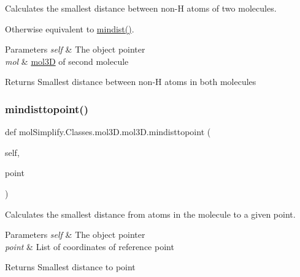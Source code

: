Calculates the smallest distance between non-\/H atoms of two molecules. 

Otherwise equivalent to \hyperlink{classmolSimplify_1_1Classes_1_1mol3D_1_1mol3D_ab051fea5908eab8ddcd39d4ea4688657}{mindist()}. 
\begin{DoxyParams}{Parameters}
{\em self} & The object pointer \\
\hline
{\em mol} & \hyperlink{classmolSimplify_1_1Classes_1_1mol3D_1_1mol3D}{mol3D} of second molecule \\
\hline
\end{DoxyParams}
\begin{DoxyReturn}{Returns}
Smallest distance between non-\/H atoms in both molecules 
\end{DoxyReturn}
\mbox{\label{classmolSimplify_1_1Classes_1_1mol3D_1_1mol3D_a9002b30e6f3e13fb41c0080f4fec6ce1}} 
\subsubsection{\texorpdfstring{mindisttopoint()}{mindisttopoint()}}
{\footnotesize\ttfamily def mol\+Simplify.\+Classes.\+mol3\+D.\+mol3\+D.\+mindisttopoint (\begin{DoxyParamCaption}\item[{}]{self,  }\item[{}]{point }\end{DoxyParamCaption})}



Calculates the smallest distance from atoms in the molecule to a given point. 


\begin{DoxyParams}{Parameters}
{\em self} & The object pointer \\
\hline
{\em point} & List of coordinates of reference point \\
\hline
\end{DoxyParams}
\begin{DoxyReturn}{Returns}
Smallest distance to point 
\end{DoxyReturn}
\mbox{\label{classmolSimplify_1_1Classes_1_1mol3D_1_1mol3D_aec0cabe05c899a3825c523add5e352ce}} 
